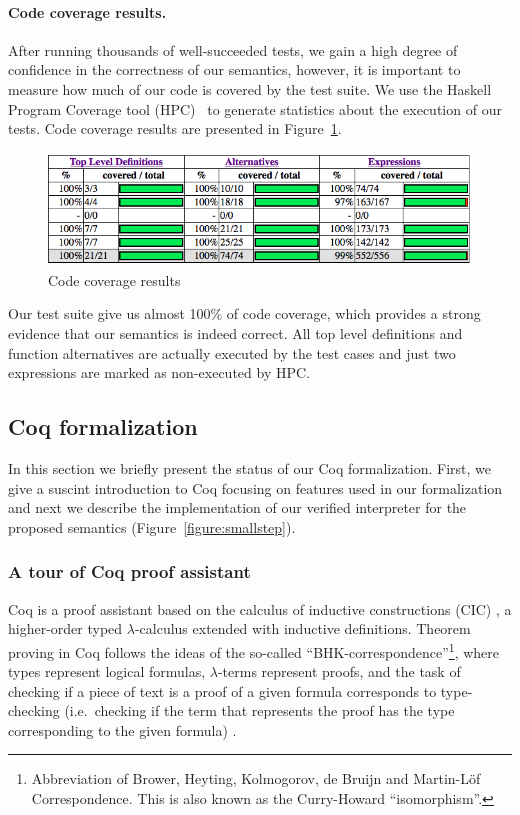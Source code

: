\documentclass[sigplan]{acmart}
\theoremstyle{definition}
\begin{document}
\paragraph{Code coverage results.}

After running thousands of well-succeeded tests, we gain a high degree of confidence in the correctness
of our semantics, however, it is important to measure how much of our code is covered by the test suite.
We use the Haskell Program Coverage tool (HPC)~\cite{Gill2007} to generate statistics about the execution of our tests.
Code coverage results are presented in Figure~\ref{figure:coverage}.

\begin{figure}[h!]
  \includegraphics[width=\linewidth]{coverage-results.png}
  \caption{Code coverage results}
  \label{figure:coverage}
\end{figure}

Our test suite give us almost 100\% of code coverage, which provides a strong evidence that our semantics
is indeed correct. All top level definitions and function alternatives are actually executed by the test cases
and just two expressions are marked as non-executed by HPC.

\subsection{Coq formalization}\label{subsection:coq-formalization}

In this section we briefly present the status of our Coq formalization. First, we give a suscint introduction
to Coq focusing on features used in our formalization and next we describe the implementation of our
verified interpreter for the proposed semantics (Figure~\ref{figure:smallstep}).

\subsubsection{A tour of Coq proof assistant}



Coq is a proof assistant based on the calculus of inductive
constructions (CIC) \cite{Bertot2010}, a higher-order typed
$\lambda$-calculus extended with inductive definitions. Theorem
proving in Coq follows the ideas of the so-called
``BHK-correspondence''\footnote{Abbreviation of Brower, Heyting,
  Kolmogorov, de Bruijn and Martin-L\"of Correspondence. This is also
  known as the Curry-Howard ``isomorphism''.}, where types represent
logical formulas, $\lambda$-terms represent proofs, and the task of
checking if a piece of text is a proof of a given formula corresponds
to type-checking (i.e.~checking if the term that represents the proof
has the type corresponding to the given formula) \cite{Sorensen2006}.
\end{document}
